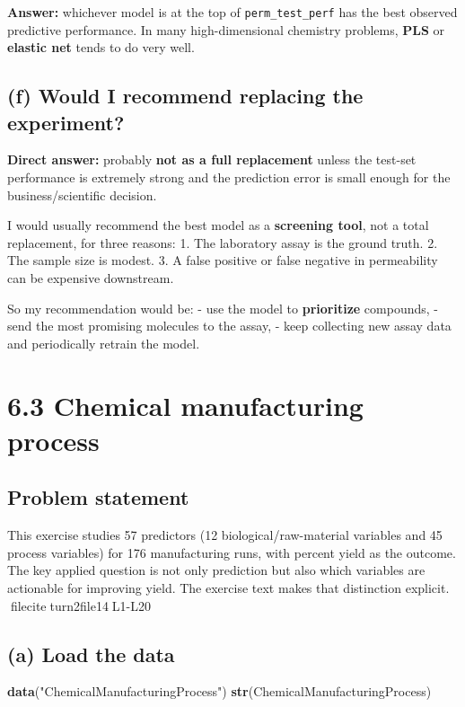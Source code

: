\documentclass[
  11pt,
]{article}
\newenvironment{Shaded}{\begin{snugshade}}{\end{snugshade}}
\newcommand{\FunctionTok}[1]{\textcolor[rgb]{0.13,0.29,0.53}{\textbf{#1}}}
\newcommand{\NormalTok}[1]{#1}
\newcommand{\StringTok}[1]{\textcolor[rgb]{0.31,0.60,0.02}{#1}}
\begin{document}
\textbf{Answer:} whichever model is at the top of
\texttt{perm\_test\_perf} has the best observed predictive performance.
In many high-dimensional chemistry problems, \textbf{PLS} or
\textbf{elastic net} tends to do very well.

\subsection{(f) Would I recommend replacing the
experiment?}\label{f-would-i-recommend-replacing-the-experiment}

\textbf{Direct answer:} probably \textbf{not as a full replacement}
unless the test-set performance is extremely strong and the prediction
error is small enough for the business/scientific decision.

I would usually recommend the best model as a \textbf{screening tool},
not a total replacement, for three reasons: 1. The laboratory assay is
the ground truth. 2. The sample size is modest. 3. A false positive or
false negative in permeability can be expensive downstream.

So my recommendation would be: - use the model to \textbf{prioritize}
compounds, - send the most promising molecules to the assay, - keep
collecting new assay data and periodically retrain the model.

\section{6.3 Chemical manufacturing
process}\label{chemical-manufacturing-process}

\subsection{Problem statement}\label{problem-statement-2}

This exercise studies 57 predictors (12 biological/raw-material
variables and 45 process variables) for 176 manufacturing runs, with
percent yield as the outcome. The key applied question is not only
prediction but also which variables are actionable for improving yield.
The exercise text makes that distinction explicit.
fileciteturn2file14L1-L20

\subsection{(a) Load the data}\label{a-load-the-data-2}

\begin{Shaded}
\begin{Highlighting}[]
\FunctionTok{data}\NormalTok{(}\StringTok{"ChemicalManufacturingProcess"}\NormalTok{)}
\FunctionTok{str}\NormalTok{(ChemicalManufacturingProcess)}
\end{Highlighting}
\end{Shaded}
\end{document}
